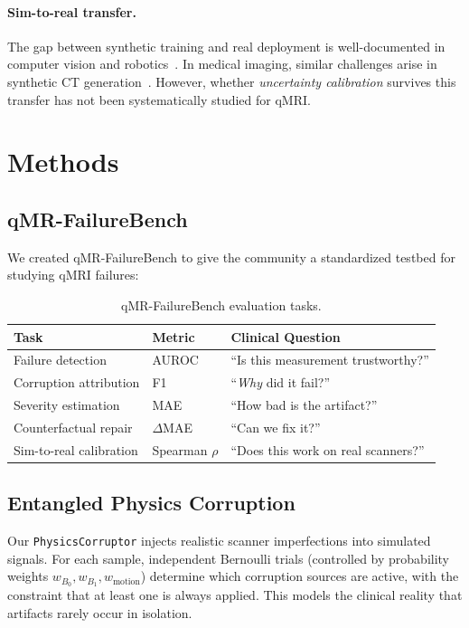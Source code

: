 \documentclass[11pt,a4paper]{article}
\begin{document}
\paragraph{Sim-to-real transfer.}
The gap between synthetic training and real deployment is well-documented in computer vision and robotics~\citep{tobin2017domain}. In medical imaging, similar challenges arise in synthetic CT generation~\citep{han2019deep}. However, whether \emph{uncertainty calibration} survives this transfer has not been systematically studied for qMRI.

\section{Methods}
\label{sec:methods}

\subsection{qMR-FailureBench}

We created qMR-FailureBench to give the community a standardized testbed for studying qMRI failures:

\begin{table}[H]
  \centering
  \caption{qMR-FailureBench evaluation tasks.}
  \label{tab:tasks}
  \begin{tabular}{@{}lll@{}}
    \toprule
    \textbf{Task} & \textbf{Metric} & \textbf{Clinical Question} \\
    \midrule
    Failure detection & AUROC & ``Is this measurement trustworthy?'' \\
    Corruption attribution & F1 & ``\emph{Why} did it fail?'' \\
    Severity estimation & MAE & ``How bad is the artifact?'' \\
    Counterfactual repair & $\Delta$MAE & ``Can we fix it?'' \\
    Sim-to-real calibration & Spearman $\rho$ & ``Does this work on real scanners?'' \\
    \bottomrule
  \end{tabular}
\end{table}

\subsection{Entangled Physics Corruption}

Our \texttt{PhysicsCorruptor} injects realistic scanner imperfections into simulated signals. For each sample, independent Bernoulli trials (controlled by probability weights $w_{B_0}, w_{B_1}, w_{\text{motion}}$) determine which corruption sources are active, with the constraint that at least one is always applied. This models the clinical reality that artifacts rarely occur in isolation.
\end{document}

